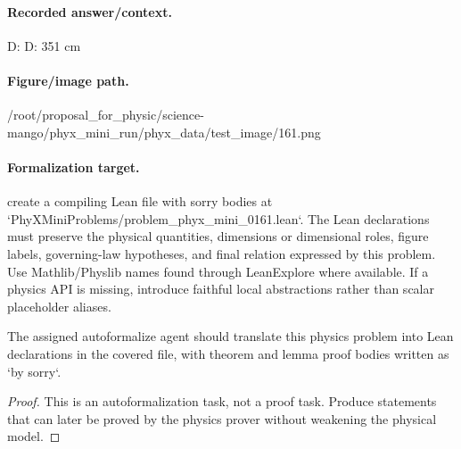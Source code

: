 \paragraph{Recorded answer/context.}
D: D: 351 cm

\paragraph{Figure/image path.}
/root/proposal\_for\_physic/science-mango/phyx\_mini\_run/phyx\_data/test\_image/161.png

\paragraph{Formalization target.}
create a compiling Lean file with sorry bodies at `PhyXMiniProblems/problem\_phyx\_mini\_0161.lean`. The Lean declarations must preserve the physical quantities, dimensions or dimensional roles, figure labels, governing-law hypotheses, and final relation expressed by this problem.
Use Mathlib/Physlib names found through LeanExplore where available. If a physics API is missing, introduce faithful local abstractions rather than scalar placeholder aliases.

\begin{theorem}
\label{thm:physics:phyx_mini_0161:target}
The assigned autoformalize agent should translate this physics problem into Lean declarations in the covered file, with theorem and lemma proof bodies written as `by sorry`.
\end{theorem}
\begin{proof}
This is an autoformalization task, not a proof task. Produce statements that can later be proved by the physics prover without weakening the physical model.
\end{proof}

